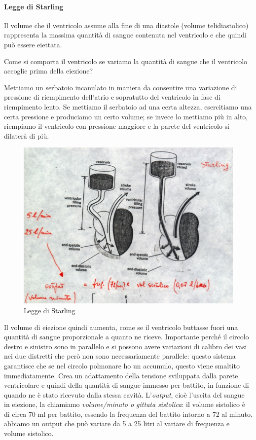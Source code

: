 \documentclass[a4paper,12pt]{article}
\begin{document}
\paragraph{Legge di Starling}
Il volume che il ventricolo assume alla fine di una diastole (volume telidiastolico) rappresenta la massima quantità di sangue contenuta nel ventricolo e che quindi può essere eiettata. 

Come si comporta il ventricolo se variamo la quantità di sangue che il ventricolo accoglie prima della eiezione? 

Mettiamo un serbatoio incanulato in maniera da consentire una variazione di pressione di riempimento dell'atrio e sopratutto del ventricolo in fase di riempimento lento. Se mettiamo il serbatoio ad una certa altezza, esercitiamo una certa pressione e produciamo un certo volume; se invece lo mettiamo più in alto, riempiamo il ventricolo con pressione maggiore e la parete del ventricolo si dilaterà di più. 
\begin{figure}[H]
\centering
\includegraphics[scale=0.3]{immagine/starling.jpg}
\caption{Legge di Starling}
\end{figure}

Il volume di eiezione quindi aumenta, come se il ventricolo buttasse fuori una quantità di sangue proporzionale a quanto ne riceve. Importante perché il circolo destro e sinistro sono in parallelo e si possono avere variazioni di calibro dei vasi nei due distretti che però non sono necessariamente parallele: questo sistema garantisce che se nel circolo polmonare ho un accumulo, questo viene smaltito immediatamente. Crea un adattamento della tensione sviluppata dalla parete ventricolare e quindi della quantità di sangue immesso per battito, in funzione di quando ne è stato ricevuto dalla stessa cavità. L'\emph{output}, cioè l'uscita del sangue in eiezione, la chiamiamo \emph{volume/minuto o gittata sistolica}: il volume sistolico è di circa 70 ml per battito, essendo la frequenza del battito intorno a 72 al minuto, abbiamo un output che può variare da 5 a 25 litri al variare di frequenza e volume sistolico. 
\end{document}
